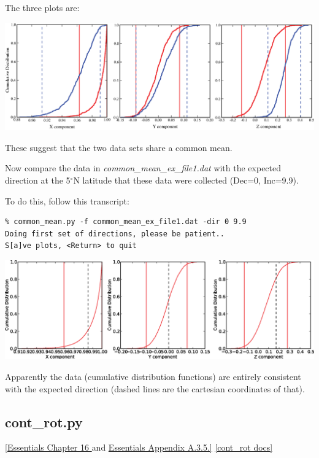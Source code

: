 \documentclass[11pt]{book}
\begin{document}
{{\noindent The three plots are:

{ %
  \includegraphics[width=15cm]{EPSfiles/common-mean.eps}}

These suggest that  the two data sets share a common mean.

Now compare the data in  {\it common\_mean\_ex\_file1.dat }  with the expected direction at the 5$^{\circ}$N latitude that these data were collected (Dec=0, Inc=9.9).

To do this,  follow this transcript:

\begin{verbatim}
% common_mean.py -f common_mean_ex_file1.dat -dir 0 9.9
Doing first set of directions, please be patient..
S[a]ve plots, <Return> to quit
\end{verbatim}

{%
  \includegraphics[width=15cm]{EPSfiles/common-mean-EX.eps}}

Apparently the data (cumulative distribution functions) are entirely consistent with the expected direction (dashed lines are the cartesian coordinates of that).



\subsection{cont\_rot.py}
\href{http://earthref.org/MAGIC/books/Tauxe/Essentials/WebBook3ch16.html#ch16}{[Essentials Chapter 16 }and \href{http://earthref.org/MAGIC/books/Tauxe/Essentials/WebBook3ap1.html#polerot}{Essentials Appendix A.3.5.]}
\href{https://github.com/PmagPy/PmagPy/blob/master/programs/cont_rot.py}{[cont\_rot docs]}

}}
\end{document}
